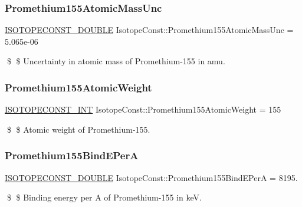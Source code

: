 \subsubsection{\texorpdfstring{Promethium155\+Atomic\+Mass\+Unc}{Promethium155AtomicMassUnc}}
{\footnotesize\ttfamily \mbox{\hyperlink{group___isotope_const-_macros_ga8f45a7272ce02c0b4c65c44636ed719a}{I\+S\+O\+T\+O\+P\+E\+C\+O\+N\+S\+T\+\_\+\+D\+O\+U\+B\+LE}} Isotope\+Const\+::\+Promethium155\+Atomic\+Mass\+Unc = 5.\+065e-\/06}

\$ \$ Uncertainty in atomic mass of Promethium-\/155 in amu. \mbox{\label{group___isotope_const-_promethium-_pm155_gae6dc8dc7620e5a96e40cfdab7eaea619}} 
\subsubsection{\texorpdfstring{Promethium155\+Atomic\+Weight}{Promethium155AtomicWeight}}
{\footnotesize\ttfamily \mbox{\hyperlink{group___isotope_const-_macros_ga5f18360b3e99483a35c32d789e62621c}{I\+S\+O\+T\+O\+P\+E\+C\+O\+N\+S\+T\+\_\+\+I\+NT}} Isotope\+Const\+::\+Promethium155\+Atomic\+Weight = 155}

\$ \$ Atomic weight of Promethium-\/155. \mbox{\label{group___isotope_const-_promethium-_pm155_gae12331573d0d438972be487c0c8f3135}} 
\subsubsection{\texorpdfstring{Promethium155\+Bind\+E\+PerA}{Promethium155BindEPerA}}
{\footnotesize\ttfamily \mbox{\hyperlink{group___isotope_const-_macros_ga8f45a7272ce02c0b4c65c44636ed719a}{I\+S\+O\+T\+O\+P\+E\+C\+O\+N\+S\+T\+\_\+\+D\+O\+U\+B\+LE}} Isotope\+Const\+::\+Promethium155\+Bind\+E\+PerA = 8195.}

\$ \$ Binding energy per A of Promethium-\/155 in keV. \mbox{\label{group___isotope_const-_promethium-_pm155_gaa87f1bd606f85ad8a85287db6acda291}} 
